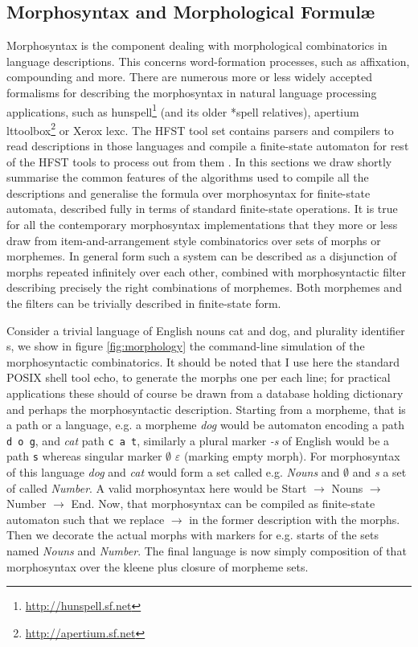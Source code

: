 \documentclass{llncs}
\begin{document}
\subsection{Morphosyntax and Morphological Formul\ae}

Morphosyntax
is
the
component
dealing
with
morphological
combinatorics
in
language
descriptions.
This
concerns
word-formation
processes,
such
as
affixation,
compounding
and
more.
There
are
numerous
more
or
less
widely
accepted
formalisms
for
describing
the
morphosyntax
in
natural
language
processing
applications,
such
as
hunspell\footnote{\url{http://hunspell.sf.net}}
(and
its
older
*spell
relatives),
apertium
lttoolbox\footnote{\url{http://apertium.sf.net}}
or
Xerox
lexc\cite{beesley/2003}.
The
HFST
tool
set
contains
parsers
and
compilers
to
read
descriptions
in
those
languages
and
compile
a
finite-state
automaton
for
rest
of
the
HFST
tools
to
process
out
from
them
\cite{pirinen/2010/il,pirinen/2009/sfcm,pirinen/2012/lrec}.
In
this
sections
we
draw
shortly
summarise
the
common
features
of
the
algorithms
used
to
compile
all
the
descriptions
and
generalise
the
formula
over
morphosyntax
for
finite-state
automata,
described
fully
in
terms
of
standard
finite-state
operations.
It
is
true
for
all
the
contemporary
morphosyntax
implementations
that
they
more
or
less
draw
from
item-and-arrangement
style
combinatorics
over
sets
of
morphs
or
morphemes.
In
general
form
such
a
system
can
be
described
as
a
disjunction of morphs repeated infinitely over each other, combined with
morphosyntactic filter describing precisely the right combinations of morphemes.
Both morphemes and the filters can be trivially described in finite-state form.

Consider a trivial language of English nouns cat and dog, and plurality identifier s, we show in figure \ref{fig:morphology} the command-line simulation of
the morphosyntactic combinatorics. It should be noted that I use here
the standard POSIX shell tool echo, to generate the morphs one per each line;
for practical applications these should of course be drawn from a database
holding dictionary and perhaps the morphosyntactic description.
Starting from a morpheme,
that is a path or a language, e.g.  a morpheme \emph{dog} would be automaton
encoding a path \texttt{d o g}, and \emph{cat} path \texttt{c a t}, similarly a
plural marker \emph{-s} of English would be a path \texttt{s} whereas singular
marker \emph{$\emptyset$} \texttt{$\varepsilon$} (marking empty morph). For
morphosyntax of this language \emph{dog} and \emph{cat} would form a set called
e.g. \emph{Nouns} and \emph{$\emptyset$} and \emph{s} a set of called
\emph{Number}. A valid morphosyntax here would be Start $\rightarrow$ Nouns
$\rightarrow$ Number $\rightarrow$ End. Now, that morphosyntax can be compiled
as finite-state automaton such that we replace $\rightarrow$ in the former
description with the morphs. Then we decorate the actual morphs with markers
for e.g. starts of the sets named \emph{Nouns} and \emph{Number}. The final
language is now simply composition of that morphosyntax over the kleene plus
closure of morpheme sets.
\end{document}
